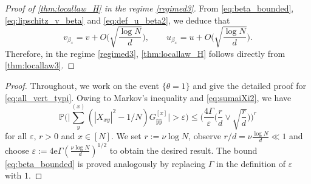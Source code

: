 \documentclass[11pt]{article}
\newcommand{\eps}{\varepsilon}
\theoremstyle{plain}
\theoremstyle{remark}
\numberwithin{equation}{section}
\newcommand*\bset[1]{[#1]}
\newcommand*\ubarr[1]{{\widehat{#1}}}
\begin{document}
	\begin{proof}[Proof of \cref{thm:locallaw_H} in the regime \eqref{regimed3}] 
	From \eqref{eq:beta_bounded}, \eqref{eq:lipschitz_v_beta} and \eqref{eq:def_u_beta2}, we deduce that 
	\[ v_{\beta_x} = v + O\bigg( \sqrt{\frac{\log N}{d}}\bigg), 
	\qquad u_{\beta_x} = u + O \bigg( \sqrt{\frac{\log N}{d}}\bigg). 
	\]
	Therefore, in the regime \eqref{regimed3}, \cref{thm:locallaw_H} 
	follows directly from \cref{thm:locallaw3}. 
	\end{proof} 
	
	
	\begin{proof}
		Throughout, we work on the event $\{\theta =1\}$ and give the detailed proof for \eqref{eq:all_vert_typi}. Owing to Markov's inequality and \eqref{eq:sumaiXi2}, we have
		\begin{equation*}
			\mathbb{P} \biggl( \biggl|\sum_{y}^{(x)} \left( |X_{xy}|^2 - 1/N \right) G_{\ubarr{y}\ubarr{y}}^{\bset{x}}\biggr| > \eps \biggr) \le \biggl( \frac{4 \Gamma}{\eps} \biggl(\frac{r}{d} \vee \sqrt{\frac{r}{d}} \biggr) \biggr)^r
		\end{equation*}
		for all $\eps$, $r >0$ and $x \in [N]$. We set $r:= \nu \log N$, observe $r/d =  \nu \frac{\log N}{d}\ll 1$ and choose $\eps := 4 \mathrm{e} \Gamma(\frac{\nu\log N}{d})^{1/2} $ to obtain the desired result. The bound \eqref{eq:beta_bounded} is proved analogously by replacing $\Gamma$ in the definition of $\eps$ with $1$.
	\end{proof}

	
	
\end{document}
